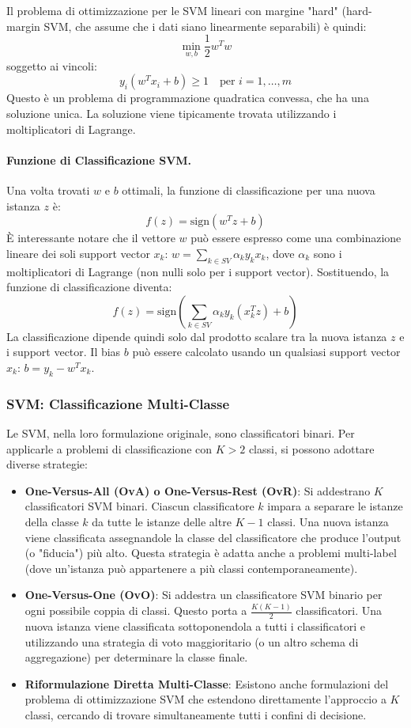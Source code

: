 \documentclass{article}
\begin{document}
Il problema di ottimizzazione per le SVM lineari con margine "hard" (hard-margin SVM, che assume che i dati siano linearmente separabili) è quindi:
$$ \min_{w,b} \frac{1}{2} w^T w $$
soggetto ai vincoli:
$$ y_i (w^T x_i + b) \ge 1 \quad \text{per } i=1, \dots, m $$
Questo è un problema di programmazione quadratica convessa, che ha una soluzione unica. La soluzione viene tipicamente trovata utilizzando i moltiplicatori di Lagrange.

\paragraph{Funzione di Classificazione SVM.}
Una volta trovati $w$ e $b$ ottimali, la funzione di classificazione per una nuova istanza $z$ è:
$$ f(z) = \text{sign}(w^T z + b) $$
È interessante notare che il vettore $w$ può essere espresso come una combinazione lineare dei soli support vector $x_k$: $w = \sum_{k \in SV} \alpha_k y_k x_k$, dove $\alpha_k$ sono i moltiplicatori di Lagrange (non nulli solo per i support vector). Sostituendo, la funzione di classificazione diventa:
$$ f(z) = \text{sign} \left( \sum_{k \in SV} \alpha_k y_k (x_k^T z) + b \right) $$
La classificazione dipende quindi solo dal prodotto scalare tra la nuova istanza $z$ e i support vector. Il bias $b$ può essere calcolato usando un qualsiasi support vector $x_k$: $b = y_k - w^T x_k$.

\subsubsection{SVM: Classificazione Multi-Classe}
Le SVM, nella loro formulazione originale, sono classificatori binari. Per applicarle a problemi di classificazione con $K > 2$ classi, si possono adottare diverse strategie:
\begin{itemize}
    \item \textbf{One-Versus-All (OvA) o One-Versus-Rest (OvR)}: Si addestrano $K$ classificatori SVM binari. Ciascun classificatore $k$ impara a separare le istanze della classe $k$ da tutte le istanze delle altre $K-1$ classi. Una nuova istanza viene classificata assegnandole la classe del classificatore che produce l'output (o "fiducia") più alto. Questa strategia è adatta anche a problemi multi-label (dove un'istanza può appartenere a più classi contemporaneamente).
    \item \textbf{One-Versus-One (OvO)}: Si addestra un classificatore SVM binario per ogni possibile coppia di classi. Questo porta a $\frac{K(K-1)}{2}$ classificatori. Una nuova istanza viene classificata sottoponendola a tutti i classificatori e utilizzando una strategia di voto maggioritario (o un altro schema di aggregazione) per determinare la classe finale.
    \item \textbf{Riformulazione Diretta Multi-Classe}: Esistono anche formulazioni del problema di ottimizzazione SVM che estendono direttamente l'approccio a $K$ classi, cercando di trovare simultaneamente tutti i confini di decisione.
\end{itemize}
\end{document}
